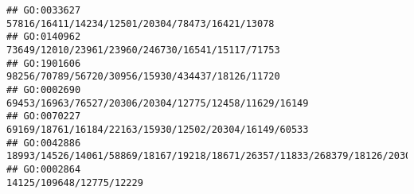 \documentclass[
]{article}
\begin{document}
\begin{verbatim}
## GO:0033627                                                                                                                                                                                                                                                                                                                                                              57816/16411/14234/12501/20304/78473/16421/13078
## GO:0140962                                                                                                                                                                                                                                                                                                                                                             73649/12010/23961/23960/246730/16541/15117/71753
## GO:1901606                                                                                                                                                                                                                                                                                                                                                             98256/70789/56720/30956/15930/434437/18126/11720
## GO:0002690                                                                                                                                                                                                                                                                                                                                                        69453/16963/76527/20306/20304/12775/12458/11629/16149
## GO:0070227                                                                                                                                                                                                                                                                                                                                                        69169/18761/16184/22163/15930/12502/20304/16149/60533
## GO:0042886                                                                                                                                                                                                                                                                              18993/14526/14061/58869/18167/19218/18671/26357/11833/268379/18126/20304/12143/21943/56643/116838/22270/21354/21355/16149/11551
## GO:0002864                                                                                                                                                                                                                                                                                                                                                                                     14125/109648/12775/12229

\end{verbatim}
\end{document}
